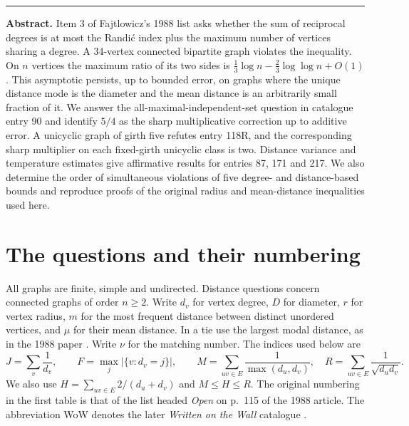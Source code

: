 \documentclass[11pt,a4paper]{article}
\theoremstyle{remark}\newtheorem*{remark}{Remark}
\begin{document}
\thispagestyle{plain}
\par
\vspace{6pt}
\par
\vspace{4pt}
\par
\vspace{7pt}\par
\vspace{8pt}\hrule\vspace{8pt}
\noindent\textbf{Abstract.} Item 3 of Fajtlowicz's 1988 list asks whether the sum of reciprocal degrees is at most the Randi\'c index plus the maximum number of vertices sharing a degree. A 34-vertex connected bipartite graph violates the inequality. On $n$ vertices the maximum ratio of its two sides is $\frac13\log n-\frac23\log\log n+O(1)$. This asymptotic persists, up to bounded error, on graphs where the unique distance mode is the diameter and the mean distance is an arbitrarily small fraction of it. We answer the all-maximal-independent-set question in catalogue entry 90 and identify $5/4$ as the sharp multiplicative correction up to additive error. A unicyclic graph of girth five refutes entry 118R, and the corresponding sharp multiplier on each fixed-girth unicyclic class is two. Distance variance and temperature estimates give affirmative results for entries 87, 171 and 217. We also determine the order of simultaneous violations of five degree- and distance-based bounds and reproduce proofs of the original radius and mean-distance inequalities used here.

\section{The questions and their numbering}\label{sec:questions}
All graphs are finite, simple and undirected. Distance questions concern connected graphs of order $n\ge2$. Write $d_v$ for vertex degree, $D$ for diameter, $r$ for vertex radius, $m$ for the most frequent distance between distinct unordered vertices, and $\mu$ for their mean distance. In a tie use the largest modal distance, as in the 1988 paper \cite{faj}. Write $\nu$ for the matching number. The indices used below are
\[
 J=\sum_v\frac1{d_v},\qquad F=\max_j|\{v:d_v=j\}|,\qquad
 M=\sum_{uv\in E}\frac1{\max(d_u,d_v)},\quad R=\sum_{uv\in E}\frac1{\sqrt{d_ud_v}}.
\]
We also use $H=\sum_{uv\in E}2/(d_u+d_v)$ and $M\le H\le R$. The original numbering in the first table is that of the list headed \emph{Open} on p.~115 of the 1988 article. The abbreviation WoW denotes the later \emph{Written on the Wall} catalogue \cite{wow}.
\end{document}
